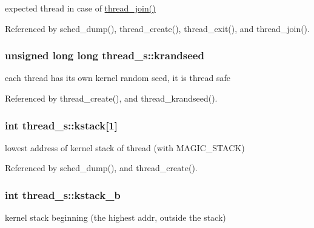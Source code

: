 expected thread in case of \hyperlink{kthread_8c_a4e54fc344bbd735b027c03629927abb9}{thread\-\_\-join()} 



Referenced by sched\-\_\-dump(), thread\-\_\-create(), thread\-\_\-exit(), and thread\-\_\-join().

\hypertarget{structthread__s_ae4614b780e1a47305c562869870d6e41}{
\subsubsection[{krandseed}]{\setlength{\rightskip}{0pt plus 5cm}unsigned long long thread\-\_\-s\-::krandseed}}\label{structthread__s_ae4614b780e1a47305c562869870d6e41}


each thread has its own kernel random seed, it is thread safe 



Referenced by thread\-\_\-create(), and thread\-\_\-krandseed().

\hypertarget{structthread__s_a1159b3f03199aed705bf099f2eb33a92}{
\subsubsection[{kstack}]{\setlength{\rightskip}{0pt plus 5cm}int thread\-\_\-s\-::kstack\mbox{[}1\mbox{]}}}\label{structthread__s_a1159b3f03199aed705bf099f2eb33a92}


lowest address of kernel stack of thread (with M\-A\-G\-I\-C\-\_\-\-S\-T\-A\-C\-K) 



Referenced by sched\-\_\-dump(), and thread\-\_\-create().

\hypertarget{structthread__s_a6885e765fcfe5d2ad0e5a07c2df3ee69}{
\subsubsection[{kstack\-\_\-b}]{\setlength{\rightskip}{0pt plus 5cm}int thread\-\_\-s\-::kstack\-\_\-b}}\label{structthread__s_a6885e765fcfe5d2ad0e5a07c2df3ee69}


kernel stack beginning (the highest addr, outside the stack) 



